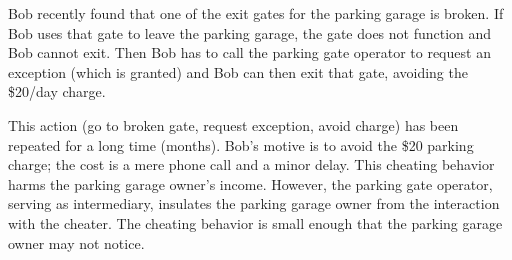 Bob recently found that one of the exit gates for the parking garage is broken. If Bob uses that gate to leave the parking garage, the gate does not function and Bob cannot exit. Then Bob has to call the parking gate operator to request an exception (which is granted) and Bob can then exit that gate, avoiding the \$20/day charge.

This action (go to broken gate, request exception, avoid charge) has been repeated for a long time (months). Bob's motive is to avoid the \$20 parking charge; the cost is a mere phone call and a minor delay. This cheating behavior harms the parking garage owner's income. However, the parking gate operator, serving as intermediary, insulates the parking garage owner from the interaction with the cheater. The cheating behavior is small enough that the parking garage owner may not notice.

